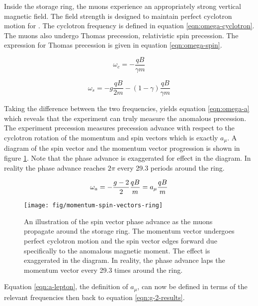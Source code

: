 Inside the storage ring, the muons experience an appropriately strong vertical magnetic field.  The field strength is \bmagic designed to maintain perfect cyclotron motion for \pmagic.  The cyclotron frequency is defined in equation \ref{eqn:omega-cyclotron}\cite{e821-prd}.  The muons also undergo Thomas precession, relativistic spin precession.  The expression for Thomas precession is given in equation \ref{eqn:omega-spin}\cite{e821-prd}.

\begin{equation}
\label{eqn:omega-cyclotron}
\omega_c = -\frac{q B}{\gamma m}
\end{equation}

\begin{equation}
\label{eqn:omega-spin}
\omega_s = -g\frac{q B}{2 m} - (1 - \gamma) \frac{q B}{\gamma m}
\end{equation}

Taking the difference between the two frequencies, yields equation \ref{eqn:omega-a} which reveals that the experiment can truly measure the anomalous precession.  The experiment precession measures precession advance with respect to the cyclotron rotation of the momentum and spin vectors which is exactly $a_\mu$.  A diagram of the spin vector and the momentum vector progression is shown in figure \ref{fig:momentum-spin-vectors-ring}.  Note that the phase advance is exaggerated for effect in the diagram.  In reality the phase advance reaches $2\pi$ every 29.3 periods around the ring.

\begin{equation}
\label{eqn:omega-a}
\omega_a = -\frac{g - 2}{2} \frac{q B}{m} \\
= a_\mu \frac{q B}{m}
\end{equation}

\begin{figure}
\label{fig:momentum-spin-vectors-ring}
\centering
\texttt{[image: fig/momentum-spin-vectors-ring]}
\caption{An illustration of the spin vector phase advance as the muons propagate around the storage ring.  The momentum vector undergoes perfect cyclotron motion and the spin vector edges forward due specifically to the anomalous magnetic moment.  The effect is exaggerated in the diagram.  In reality, the phase advance laps the momentum vector every 29.3 times around the ring.}
\end{figure}

Equation \ref{eqn:a-lepton}, the definition of $a_\mu$, can now be defined in terms of the relevant frequencies then back to equation \ref{eqn:g-2-results}.

